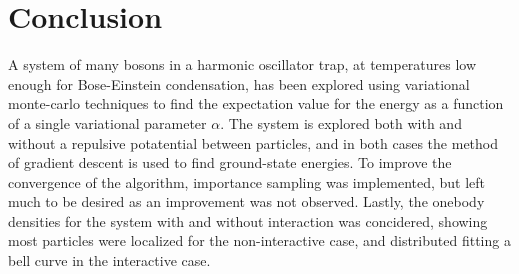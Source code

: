 \section{Conclusion}
A system of many bosons in a harmonic oscillator trap, at temperatures low enough for Bose-Einstein
condensation, has been explored using variational monte-carlo techniques to find the expectation
value for the energy as a function of a single variational parameter $\alpha$. The system is
explored both with and without a repulsive potatential between particles, and in both cases the
method of gradient descent is used to find ground-state energies. To improve the convergence of
the algorithm, importance sampling was implemented, but left much to be desired as an improvement
was not observed. Lastly, the onebody densities for the system with and without interaction was
concidered, showing most particles were localized for the non-interactive case, and distributed
fitting a bell curve in the interactive case.
